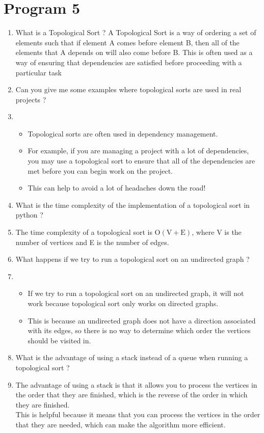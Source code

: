 ﻿\documentclass{article}
\newcommand{\answer}{\item [$\rightarrow$]}
\begin{document}
	\section*{Program 5}  
	\begin{enumerate}
		\item What is a Topological Sort ?
		A Topological Sort is a way of ordering a set of elements such that if element A comes before element B, then all of the elements that A depends on will also come before B.
		This is often used as a way of ensuring that dependencies are satisfied before proceeding with a particular task
		
		\item Can you give me some examples where topological sorts are used in real projects ?
		\answer \begin{itemize}
			\item Topological sorts are often used in dependency management.
			\item For example, if you are managing a project with a lot of dependencies, you may use a topological sort to ensure that all of the dependencies are met before you can begin work on the project.
			\item This can help to avoid a lot of headaches down the road!
		\end{itemize}
		
		\item What is the time complexity of the implementation of a topological sort in python ?
		\answer The time complexity of a topological sort is $\text{O}(\text{V}+\text{E})$, where V is the number of vertices and E is the number of edges.
		
		\item What happens if we try to run a topological sort on an undirected graph ?
		\answer \begin{itemize}
			\item If we try to run a topological sort on an undirected graph, it will not work because topological sort only works on directed graphs.
			\item This is because an undirected graph does not have a direction associated with its edges, so there is no way to determine which order the vertices should be visited in.
		\end{itemize}
		
		\item What is the advantage of using a stack instead of a queue when running a topological sort ?
		\answer The advantage of using a stack is that it allows you to process the vertices in the order that they are finished, which is the reverse of the order in which they are finished. \\
		This is helpful because it means that you can process the vertices in the order that they are needed, which can make the algorithm more efficient.
		

\end{enumerate}
\end{document}
